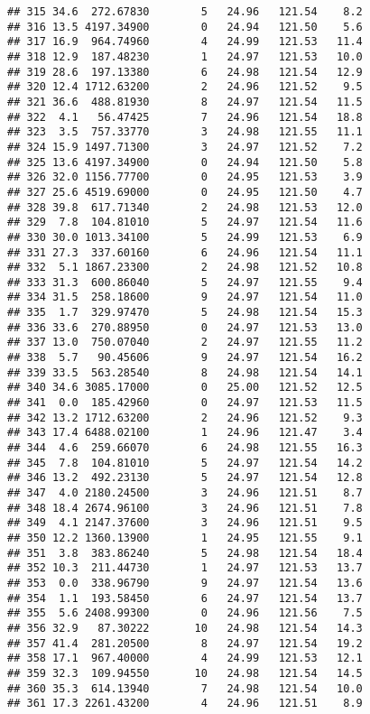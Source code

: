 \documentclass[
]{article}
\begin{document}
\begin{verbatim}
## 315 34.6  272.67830        5   24.96   121.54    8.2
## 316 13.5 4197.34900        0   24.94   121.50    5.6
## 317 16.9  964.74960        4   24.99   121.53   11.4
## 318 12.9  187.48230        1   24.97   121.53   10.0
## 319 28.6  197.13380        6   24.98   121.54   12.9
## 320 12.4 1712.63200        2   24.96   121.52    9.5
## 321 36.6  488.81930        8   24.97   121.54   11.5
## 322  4.1   56.47425        7   24.96   121.54   18.8
## 323  3.5  757.33770        3   24.98   121.55   11.1
## 324 15.9 1497.71300        3   24.97   121.52    7.2
## 325 13.6 4197.34900        0   24.94   121.50    5.8
## 326 32.0 1156.77700        0   24.95   121.53    3.9
## 327 25.6 4519.69000        0   24.95   121.50    4.7
## 328 39.8  617.71340        2   24.98   121.53   12.0
## 329  7.8  104.81010        5   24.97   121.54   11.6
## 330 30.0 1013.34100        5   24.99   121.53    6.9
## 331 27.3  337.60160        6   24.96   121.54   11.1
## 332  5.1 1867.23300        2   24.98   121.52   10.8
## 333 31.3  600.86040        5   24.97   121.55    9.4
## 334 31.5  258.18600        9   24.97   121.54   11.0
## 335  1.7  329.97470        5   24.98   121.54   15.3
## 336 33.6  270.88950        0   24.97   121.53   13.0
## 337 13.0  750.07040        2   24.97   121.55   11.2
## 338  5.7   90.45606        9   24.97   121.54   16.2
## 339 33.5  563.28540        8   24.98   121.54   14.1
## 340 34.6 3085.17000        0   25.00   121.52   12.5
## 341  0.0  185.42960        0   24.97   121.53   11.5
## 342 13.2 1712.63200        2   24.96   121.52    9.3
## 343 17.4 6488.02100        1   24.96   121.47    3.4
## 344  4.6  259.66070        6   24.98   121.55   16.3
## 345  7.8  104.81010        5   24.97   121.54   14.2
## 346 13.2  492.23130        5   24.97   121.54   12.8
## 347  4.0 2180.24500        3   24.96   121.51    8.7
## 348 18.4 2674.96100        3   24.96   121.51    7.8
## 349  4.1 2147.37600        3   24.96   121.51    9.5
## 350 12.2 1360.13900        1   24.95   121.55    9.1
## 351  3.8  383.86240        5   24.98   121.54   18.4
## 352 10.3  211.44730        1   24.97   121.53   13.7
## 353  0.0  338.96790        9   24.97   121.54   13.6
## 354  1.1  193.58450        6   24.97   121.54   13.7
## 355  5.6 2408.99300        0   24.96   121.56    7.5
## 356 32.9   87.30222       10   24.98   121.54   14.3
## 357 41.4  281.20500        8   24.97   121.54   19.2
## 358 17.1  967.40000        4   24.99   121.53   12.1
## 359 32.3  109.94550       10   24.98   121.54   14.5
## 360 35.3  614.13940        7   24.98   121.54   10.0
## 361 17.3 2261.43200        4   24.96   121.51    8.9

\end{verbatim}
\end{document}
